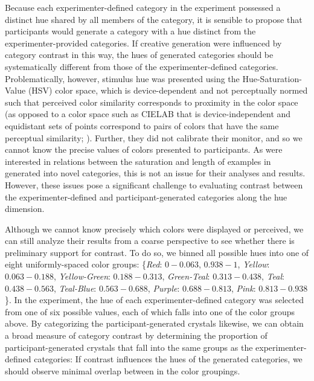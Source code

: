 \documentclass[12pt]{article}
\begin{document}
\begin{flushleft}
Because each experimenter-defined category in the \cite{jern2013probabilistic} experiment possessed a distinct hue shared by all members of the category, it is sensible to propose that participants would generate a category with a hue distinct from the experimenter-provided categories. If creative generation were influenced by category contrast in this way, the hues of generated categories should be systematically different from those of the experimenter-defined categories. Problematically, however, stimulus hue was presented using the Hue-Saturation-Value (HSV) color space, which is device-dependent and not perceptually normed such that perceived color similarity corresponds to proximity in the color space (as opposed to a color space such as CIELAB that is device-independent and equidistant sets of points correspond to pairs of colors that have the same perceptual similarity; \citealp{wyszecki1967}). Further, they did not calibrate their monitor, and so we cannot know the precise values of colors presented to participants. As \cite{jern2013probabilistic} were interested in relations between the saturation and length of examples in generated into novel categories, this is not an issue for their analyses and results. However, these issues pose a significant challenge to evaluating contrast between the experimenter-defined and participant-generated categories along the hue dimension.

Although we cannot know precisely which colors were displayed or perceived, we can still analyze their results from a coarse perspective to see whether there is preliminary support for contrast. To do so, we binned all possible hues into one of eight uniformly-spaced color groups: \{{\em Red}: $0-0.063$, $0.938-1$, {\em Yellow}: $0.063-0.188$, {\em Yellow-Green}: $0.188-0.313$, {\em Green-Teal}: $0.313-0.438$, {\em Teal}: $0.438-0.563$, {\em Teal-Blue}: $0.563-0.688$, {\em Purple}: $0.688-0.813$, {\em Pink}: $0.813-0.938$\}. In the \cite{jern2013probabilistic} experiment, the hue of each experimenter-defined category was selected from one of six possible values, each of which falls into one of the color groups above. By categorizing the participant-generated crystals likewise, we can obtain a broad measure of category contrast by determining the proportion of participant-generated crystals that fall into the same groups as the experimenter-defined categories: If contrast influences the hues of the generated categories, we should observe minimal overlap between in the color groupings.




\end{flushleft}
\end{document}
